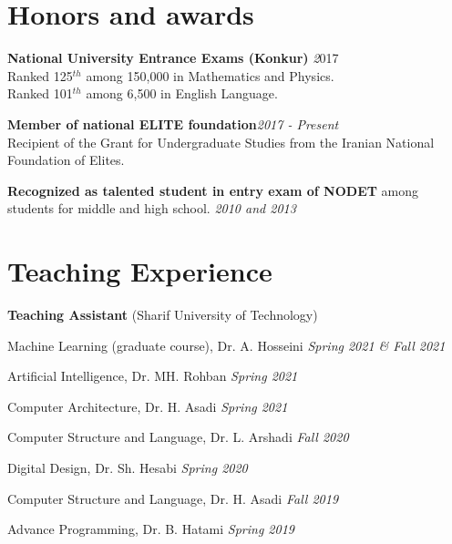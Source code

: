 \documentclass[11pt,line,margin]{resume}
\begin{document}
\begin{resume}
\section{\sc Honors and awards}
\begin{list2}
\item[] {\bf National University Entrance Exams (Konkur) }  \hfill {\textit
2017}\\
			Ranked 125$^{th}$ among 150,000 in Mathematics and Physics. \\
			Ranked 101$^{th}$ among 6,500 in English Language. 

\item[] {\bf Member of national ELITE foundation}\hfill\textit{2017 - Present} \\
Recipient of the Grant for Undergraduate Studies from the Iranian National Foundation of Elites. 

\item[] {\bf Recognized as talented student in entry exam of NODET} among students
for middle and high school. \hfill\textit{2010 and 2013}
\end{list2}


\vspace{-0.05in}
\section{\sc Teaching Experience} 
\begin{list2}
\item[] \textbf{Teaching Assistant} (Sharif University of Technology)
\begin{list2}
\item Machine Learning (graduate course), Dr. A. Hosseini \hfill\textit{Spring 2021 \& Fall 2021}
\item Artificial Intelligence, Dr. MH. Rohban \hfill\textit{Spring 2021}
\item Computer Architecture, Dr. H. Asadi \hfill\textit{Spring 2021}
\item Computer Structure and Language, Dr. L. Arshadi \hfill\textit{Fall 2020}
\item Digital Design, Dr. Sh. Hesabi \hfill\textit{Spring 2020}
\item Computer Structure and Language, Dr. H. Asadi \hfill\textit{Fall 2019}
\item Advance Programming, Dr. B. Hatami \hfill\textit{Spring 2019}
\end{list2}
\end{list2}


\end{resume}
\end{document}
